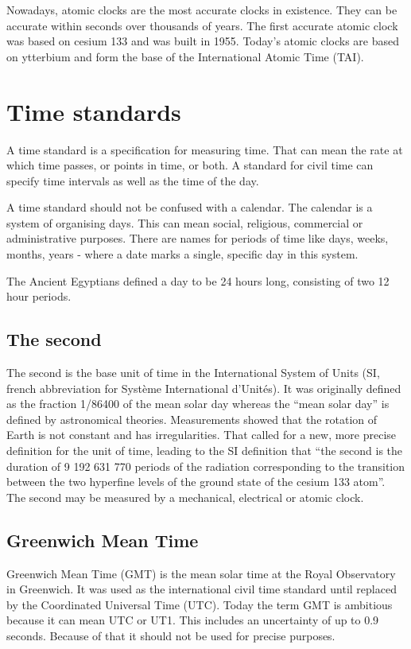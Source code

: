 Nowadays, atomic clocks are the most accurate clocks in existence. They can be accurate within seconds over thousands of years. The first accurate atomic clock was based on cesium 133 and was built in 1955. Today’s atomic clocks are based on ytterbium and form the base of the International Atomic Time (TAI).

\section{Time standards}

A time standard is a specification for measuring time. That can mean the rate at which time passes, or points in time, or both. A standard for civil time can specify time intervals as well as the time of the day.

A time standard should not be confused with a calendar. The calendar is a system of organising days. This can mean social, religious, commercial or administrative purposes. There are names for periods of time like days, weeks, months, years - where a date marks a single, specific day in this system.

The Ancient Egyptians defined a day to be 24 hours long, consisting of two 12 hour periods.

\subsection{The second}

The second is the base unit of time in the International System of Units (SI, french abbreviation for Système International d'Unités). It was originally defined as the fraction 1/86400 of the mean solar day whereas the “mean solar day” is defined by astronomical theories. Measurements showed that the rotation of Earth is not constant and has irregularities. That called for a new, more precise definition for the unit of time, leading to the SI definition that “the second is the duration of 9 192 631 770 periods of the radiation corresponding to the transition between the two hyperfine levels of the ground state of the cesium 133 atom”.
The second may be measured by a mechanical, electrical or atomic clock.

\subsection{Greenwich Mean Time}

Greenwich Mean Time (GMT) is the mean solar time at the Royal Observatory in Greenwich. It was used as the international civil time standard until replaced by the Coordinated Universal Time (UTC). Today the term GMT is ambitious because it can mean UTC or UT1. This includes an uncertainty of up to 0.9 seconds. Because of that it should not be used for precise purposes.

